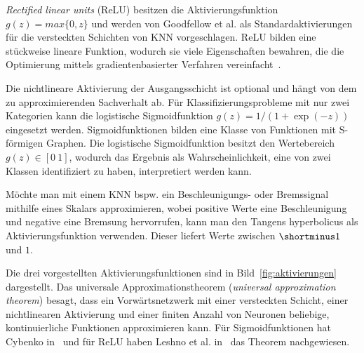 \textit{Rectified linear units} (ReLU) besitzen die Aktivierungsfunktion $g(z) = max\{0,z\}$ und werden von Goodfellow et al. als Standardaktivierungen für die versteckten Schichten von KNN vorgeschlagen. ReLU bilden eine stückweise lineare Funktion, wodurch sie viele Eigenschaften bewahren, die die Optimierung mittels gradientenbasierter Verfahren vereinfacht~\cite{GBC16}.

Die nichtlineare Aktivierung der Ausgangsschicht ist optional und hängt von dem zu approximierenden Sachverhalt ab. Für Klassifizierungsprobleme mit nur zwei Kategorien kann die logistische Sigmoidfunktion $g(z) = 1/(1+\exp(-z))$ eingesetzt werden.
Sigmoidfunktionen bilden eine Klasse von Funktionen mit S-förmigen Graphen. Die logistische Sigmoidfunktion besitzt den Wertebereich $g(z)\in[ 0~1]$, wodurch das Ergebnis als Wahrscheinlichkeit, eine von zwei Klassen identifiziert zu haben, interpretiert werden kann. 


Möchte man mit einem KNN bspw. ein Beschleunigungs- oder Bremssignal mithilfe eines Skalars approximieren, wobei positive Werte eine Beschleunigung und negative eine Bremsung hervorrufen, kann man den Tangens hyperbolicus als Aktivierungsfunktion verwenden. Dieser liefert Werte zwischen $\shortminus 1$ und $1$. 

Die drei vorgestellten Aktivierungsfunktionen sind in Bild~\ref{fig:aktivierungen} dargestellt. 
Das universale Approximationstheorem (\textit{universal approximation theorem}) besagt, dass ein Vorwärtsnetzwerk mit einer versteckten Schicht, einer nichtlinearen Aktivierung und einer finiten Anzahl von Neuronen beliebige, kontinuierliche Funktionen approximieren kann. 
Für Sigmoidfunktionen hat Cybenko in~\cite{Cyb89} und für ReLU haben Leshno et al. in~\cite{LLPS93} das Theorem nachgewiesen.

